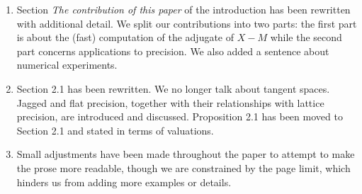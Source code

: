 \documentclass{article}
\newcommand{\done}[1]{#1}
\begin{document}
\begin{enumerate}
\item \done{Section \emph{The contribution of this paper} of the introduction
has been rewritten with additional detail. We split our contributions into two 
parts: the first part is about the (fast) computation of the adjugate
of $X{-}M$ while the second part concerns applications to precision.
We also added a sentence about numerical experiments.}
\item \done{Section 2.1 has been rewritten. We no longer talk about tangent
spaces. Jagged and flat precision, together with their relationships with
lattice precision, are introduced and discussed. 
Proposition 2.1 has been moved to Section 2.1 and stated
in terms of valuations.}
\item \done{Small adjustments have been made throughout the paper to attempt
to make the prose more readable, though we are constrained by the page
limit, which hinders us from adding more examples or details.}
\end{enumerate}
\end{document}
